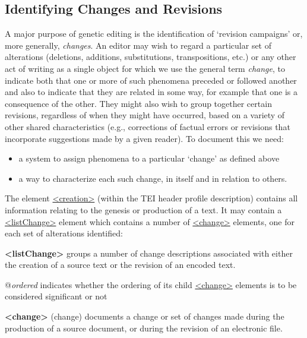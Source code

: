 \subsection[{Identifying Changes and Revisions}]{Identifying Changes and Revisions}\label{PH-changes}\par
A major purpose of genetic editing is the identification of ‘revision campaigns’ or, more generally, \textit{changes}. An editor may wish to regard a particular set of alterations (deletions, additions, substitutions, transpositions, etc.) or any other act of writing as a single object for which we use the general term \textit{change}, to indicate both that one or more of such phenomena preceded or followed another and also to indicate that they are related in some way, for example that one is a consequence of the other. They might also wish to group together certain revisions, regardless of when they might have occurred, based on a variety of other shared characteristics (e.g., corrections of factual errors or revisions that incorporate suggestions made by a given reader). To document this we need: \begin{itemize}
\item a system to assign phenomena to a particular ‘change’ as defined above
\item a way to characterize each such change, in itself and in relation to others.
\end{itemize} \par
The element \hyperref[TEI.creation]{<creation>} (within the TEI header profile description) contains all information relating to the genesis or production of a text. It may contain a \hyperref[TEI.listChange]{<listChange>} element which contains a number of \hyperref[TEI.change]{<change>} elements, one for each set of alterations identified: 
\begin{sansreflist}
  
\item [\textbf{<listChange>}] groups a number of change descriptions associated with either the creation of a source text or the revision of an encoded text.\hfil\\[-10pt]\begin{sansreflist}
    \item[@{\itshape ordered}]
  indicates whether the ordering of its child \hyperref[TEI.change]{<change>} elements is to be considered significant or not
\end{sansreflist}  
\item [\textbf{<change>}] (change) documents a change or set of changes made during the production of a source document, or during the revision of an electronic file.
\end{sansreflist}
